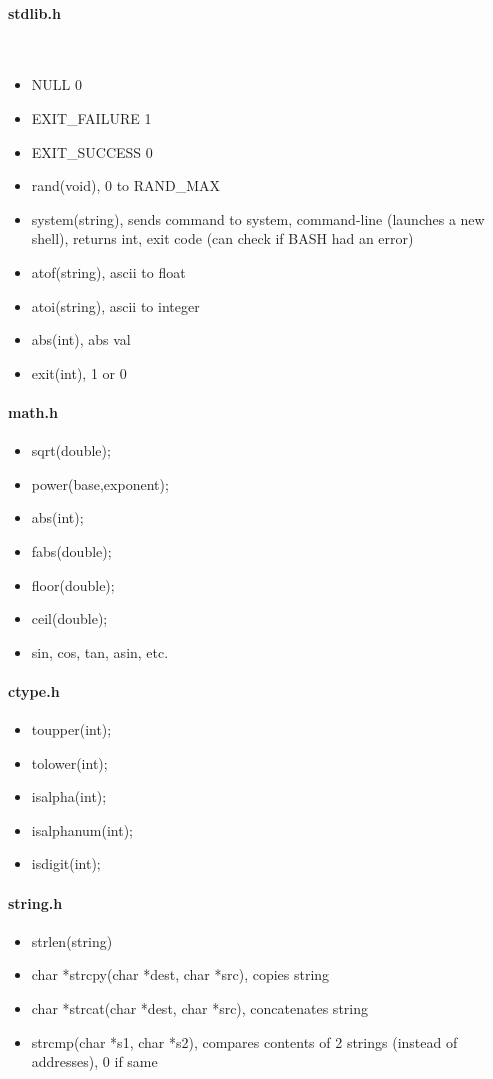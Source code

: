 \documentclass[12 pt]{article}
\begin{document}
\paragraph{stdlib.h}~
\begin{itemize}
	\item NULL 0
	\item EXIT\_FAILURE 1
	\item EXIT\_SUCCESS 0
	\item rand(void), 0 to RAND\_MAX
	\item system(string), sends command to system, command-line (launches a new shell), returns int, exit code (can check if BASH had an error)
	\item atof(string), ascii to float
	\item atoi(string), ascii to integer
	\item abs(int), abs val
	\item exit(int), 1 or 0
\end{itemize}
\paragraph{math.h}
\begin{itemize}
	\item sqrt(double);
	\item power(base,exponent);
	\item abs(int);
	\item fabs(double);
	\item floor(double);
	\item ceil(double);
	\item sin, cos, tan, asin, etc.
\end{itemize}
\paragraph{ctype.h}
\begin{itemize}
	\item toupper(int);
	\item tolower(int);
	\item isalpha(int);
	\item isalphanum(int);
	\item isdigit(int);
\end{itemize}
\paragraph{string.h}
\begin{itemize}
	\item strlen(string)
	\item char *strcpy(char *dest, char *src), copies string
	\item char *strcat(char *dest, char *src), concatenates string
	\item strcmp(char *s1, char *s2), compares contents of 2 strings (instead of addresses), 0 if same
	\end{itemize}
\end{document}
